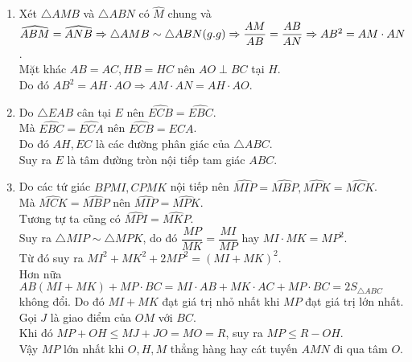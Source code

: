 \begin{ex}
{\begin{center}
		\end{center}
		\begin{enumerate}
				\item Xét $\triangle AMB$ và $\triangle ABN$ có $\widehat{M}$ chung và $\widehat{ABM}=\widehat{ANB}\\
				\Rightarrow \triangle AMB \sim \triangle ABN(g.g)\\ \Rightarrow \dfrac{AM}{AB}=\dfrac{AB}{AN}\\
				\Rightarrow AB^2=AM\cdot AN$.
				\\ Mặt khác $AB=AC, HB=HC$ nên $AO\perp BC$ tại $H$.\\
				 Do đó $AB^2=AH\cdot AO\Rightarrow AM\cdot AN=AH\cdot AO$.
			\item  Do $ \triangle EAB $ cân tại $ E $ nên $ \widehat{ECB}=\widehat{EBC}$. \\
			Mà $\widehat{EBC}=\widehat{ECA}$ nên $ \widehat{ECB}=\widehat{ECA} $.\\
			 Do đó $ AH, EC $ là các đường phân giác của $ \triangle ABC $.\\
			  Suy ra $ E $ là tâm đường tròn nội tiếp tam giác $ ABC $.
			\item Do các tứ giác $ BPMI, CPMK $ nội tiếp nên $ \widehat{MIP}=\widehat{MBP} ,  \widehat{MPK}=\widehat{MCK} $.\\
			Mà $ \widehat{MCK}=\widehat{MBP} $ nên $ \widehat{MIP}=\widehat{MPK} $.\\ Tương tự ta cũng có $ \widehat{MPI}=\widehat{MKP} $. \\
			Suy ra $ \triangle MIP \sim \triangle MPK $, do đó $ \dfrac{MP}{MK}=\dfrac{MI}{MP} $ hay $ MI\cdot MK = MP^2 $. \\
			Từ đó suy ra $ MI^2+MK^2+2MP^2=(MI+MK)^2 $.\\
			Hơn nữa $ AB(MI+MK)+MP\cdot BC=MI\cdot AB +MK\cdot AC + MP\cdot BC = 2 S_{\triangle ABC} $ không đổi. Do đó $ MI + MK $ đạt giá trị nhỏ nhất khi $ MP $ đạt giá trị lớn nhất.\\
			Gọi $ J $ là giao điểm của $ OM $ với $ BC $.\\
			Khi đó $ MP+OH \le MJ+JO=MO=R $, suy ra $ MP \le R-OH $. \\
			Vậy $ MP $ lớn nhất khi $ O,H,M $ thẳng hàng hay cát tuyến $ AMN $ đi qua tâm $ O $.
		\end{enumerate}
	}
\end{ex}

